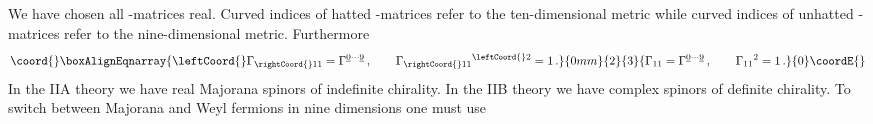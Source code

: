 \documentclass[12pt,a4paper]{article}
\begin{document}
We have chosen all \myHighlight{$\Gamma$}\coordHE{}-matrices real. Curved indices of hatted \myHighlight{$\Gamma$}\coordHE{}-matrices \myHighlight{$\hat \Gamma_{\mu}$}\coordHE{}
refer to the ten-dimensional metric while curved indices of unhatted \myHighlight{$\Gamma$}\coordHE{}-matrices \myHighlight{$\Gamma_{\mu}$}\coordHE{}
refer to the nine-dimensional metric. Furthermore
\begin{align}\coord{}\boxAlignEqnarray{
  \leftCoord{}\Gamma_{\rightCoord{}11} = \Gamma^{\underline{0} \cdots \underline{9}} \,, \qquad \Gamma_{\rightCoord{}11}{}^{\leftCoord{}2} = 1 \,.
}{0mm}{2}{3}{
  \Gamma_{11} = \Gamma^{\underline{0} \cdots \underline{9}} \,, \qquad \Gamma_{11}{}^{2} = 1 \,.
}{0}\coordE{}\end{align}
In the IIA theory we have real Majorana spinors of indefinite chirality. In the IIB theory we
have complex spinors of definite chirality. To switch between Majorana and Weyl fermions in nine
dimensions one must use
\end{document}
